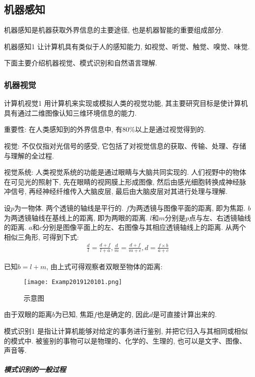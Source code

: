 \subsection{机器感知}
机器感知是机器获取外界信息的主要途径, 也是机器智能的重要组成部分.
\begin{mydef}{机器感知}{1}
让计算机具有类似于人的感知能力, 如视觉、听觉、触觉、嗅觉、味觉.
\end{mydef}
下面主要介绍机器视觉、模式识别和自然语言理解.
\subsubsection{机器视觉}
\begin{mydef}{计算机视觉}{1}
用计算机来实现或模拟人类的视觉功能, 其主要研究目标是使计算机具有通过二维图像认知三维环境信息的能力.
\end{mydef}

重要性: 在人类感知到的外界信息中, 有80\%以上是通过视觉得到的.

视觉: 不仅仅指对光信号的感受, 它包括了对视觉信息的获取、传输、处理、存储与理解的全过程.

视觉系统: 人类视觉系统的功能是通过眼睛与大脑共同实现的. 人们视野中的物体在可见光的照射下, 先在眼睛的视网膜上形成图像, 然后由感光细胞转换成神经脉冲信号, 再经神经纤维传入大脑皮层, 最后由大脑皮层对其进行处理与理解.
\begin{example}
设$p$为一物体. 两个透镜的轴线是平行的. $f$为两透镜与图像平面的距离, 即为焦距. $b$为两透镜轴线在基线上的距离, 即为两眼的距离. $l$和$m$分别是$p$点与左、右透镜轴线的距离. $a$和$c$分别是图像平面上的左、右图像与其相应透镜轴线上的距离.
从两个相似三角形, 可得到下式:
\begin{align}
  \frac d l=\frac {d+f}{l+a},  \frac d m=\frac {d+f}{m+c},  d=\frac{f\times b}{a+c}
\end{align}
\end{example}
已知$b=l+m$, 由上式可得观察者双眼至物体的距离:
\begin{figure}[htbp]
	\centering
	\texttt{[image: Examp2019120101.png]}
	\caption{示意图}
   \label{AI:Fig3}
\end{figure}
由于双眼的距离$b$为已知, 焦距$f$也是确定的, 因此$d$是可直接计算出来的.
\vspace{0.5cm}
\begin{mydef}{模式识别}{1}
是指让计算机能够对给定的事务进行鉴别, 并把它归入与其相同或相似的模式中.
被鉴别的事物可以是物理的、化学的、生理的, 也可以是文字、图像、声音等.
\end{mydef}
\subparagraph{模式识别的一般过程}

